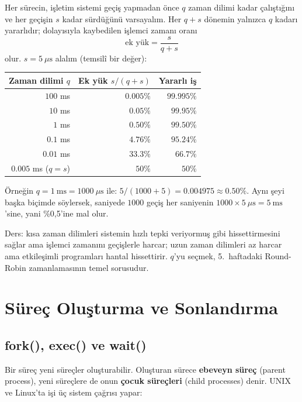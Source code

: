\documentclass[11pt,a4paper]{article}
\newcommand{\term}[1]{\textbf{\color{mintdeep}#1}}
\begin{document}
\begin{example}
Her sürecin, işletim sistemi geçiş yapmadan önce $q$ zaman dilimi kadar çalıştığını ve her geçişin $s$ kadar sürdüğünü varsayalım. Her $q + s$ dönemin yalnızca $q$ kadarı yararlıdır; dolayısıyla kaybedilen işlemci zamanı oranı
\[
\text{ek yük} = \frac{s}{q + s}
\]
olur. $s = 5\ \mu\text{s}$ alalım (temsilî bir değer):
\begin{center}
\renewcommand{\arraystretch}{1.25}
\begin{tabular}{@{}rrr@{}}
\toprule
\textbf{Zaman dilimi $q$} & \textbf{Ek yük $s/(q+s)$} & \textbf{Yararlı iş} \\
\midrule
$100$ ms & $0.005\%$ & $99.995\%$ \\
$10$ ms & $0.05\%$ & $99.95\%$ \\
$1$ ms & $0.50\%$ & $99.50\%$ \\
$0.1$ ms & $4.76\%$ & $95.24\%$ \\
$0.01$ ms & $33.3\%$ & $66.7\%$ \\
$0.005$ ms ($q = s$) & $50\%$ & $50\%$ \\
\bottomrule
\end{tabular}
\end{center}
Örneğin $q = 1\ \text{ms} = 1000\ \mu\text{s}$ ile: $5/(1000+5) = 0.004975 \approx 0.50\%$. Aynı şeyi başka biçimde söylersek, saniyede $1000$ geçiş her saniyenin $1000 \times 5\ \mu\text{s} = 5\ \text{ms}$'sine, yani \%0,5'ine mal olur.

Ders: kısa zaman dilimleri sistemin hızlı tepki veriyormuş gibi hissettirmesini sağlar ama işlemci zamanını geçişlerle harcar; uzun zaman dilimleri az harcar ama etkileşimli programları hantal hissettirir. $q$'yu seçmek, 5.~haftadaki Round-Robin zamanlamasının temel sorusudur.
\end{example}

\section{Süreç Oluşturma ve Sonlandırma}
\label{sec:creation}

\subsection{fork(), exec() ve wait()}

Bir süreç yeni süreçler oluşturabilir. Oluşturan sürece \term{ebeveyn süreç} (parent process), yeni süreçlere de onun \term{çocuk süreçleri} (child processes) denir. UNIX ve Linux'ta işi üç sistem çağrısı yapar:
\end{document}
